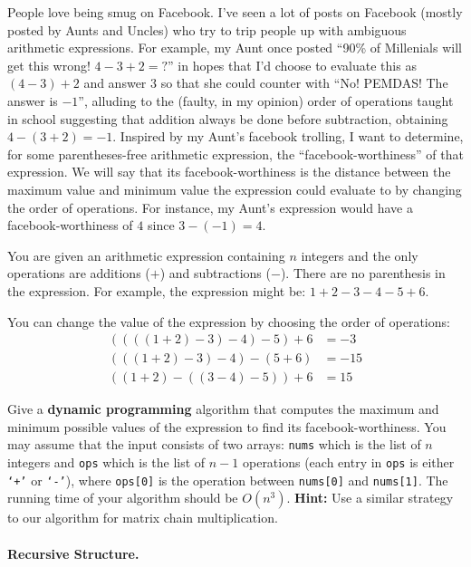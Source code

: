 
People love being smug on Facebook. I've seen a lot of posts on Facebook (mostly posted by Aunts and Uncles) who try to trip people up with ambiguous arithmetic expressions. For example, my Aunt once posted ``90\% of Millenials will get this wrong! $4-3+2=?$'' in hopes that I'd choose to evaluate this as $(4-3)+2$ and answer $3$ so that she could counter with ``No! PEMDAS! The answer is $-1$'', alluding to the (faulty, in my opinion) order of operations taught in school suggesting that addition always be done before subtraction, obtaining $4-(3+2)=-1$. Inspired by my Aunt's facebook trolling, I want to determine, for some parentheses-free arithmetic expression, the ``facebook-worthiness'' of that expression. We will say that its facebook-worthiness is the distance between the maximum value and minimum value the expression could evaluate to by changing the order of operations. For instance, my Aunt's expression would have a facebook-worthiness of $4$ since $3-(-1)=4$.

You are given an arithmetic expression containing $n$ integers and the only operations are additions ($+$)
and subtractions ($-$). There are no parenthesis in the expression. For example, the expression might be: $1 + 2 - 3 - 4 - 5 + 6$.

You can change the value of the expression by choosing the order of operations:
\begin{align*}
  ((((1 + 2) - 3) - 4) - 5) + 6 &= -3 \\
  (((1 + 2) - 3) - 4) - (5 + 6) &= -15\\
  ((1 + 2) - ((3 - 4) - 5)) + 6 &= 15
\end{align*}


Give a {\bf dynamic programming} algorithm that
computes the maximum and minimum possible values of the expression to find its facebook-worthiness. You may assume that
the input consists of two arrays: \texttt{nums} which
is the list of $n$ integers and
\texttt{ops} which is the list of $n - 1$ operations
(each entry in \texttt{ops} is either \texttt{`+'}
or \texttt{`-'}), where \texttt{ops[0]} is the operation
between \texttt{nums[0]} and \texttt{nums[1]}.
The running time of your algorithm should be $O(n^3)$.
{\bf Hint:} Use a similar strategy to our algorithm for matrix chain multiplication.


\paragraph{Recursive Structure.}

